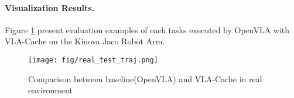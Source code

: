 \paragraph{Visualization Results. }

Figure \ref{fig:real_test_traj} present evaluation examples of each tasks executed by OpenVLA with VLA-Cache
on the Kinova Jaco Robot Arm.

\begin{figure}[h]
    \centering
    \texttt{[image: fig/real\_test\_traj.png]}
    \caption{Comparison between baseline(OpenVLA) and VLA-Cache in real environment}
    \label{fig:real_test_traj}
\end{figure}